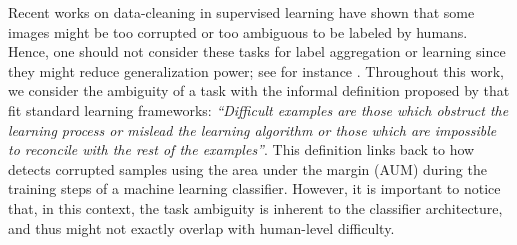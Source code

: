 Recent works on data-cleaning in supervised learning \citep{han2019deep, pleiss_identifying_2020, northcutt_confident_2021} have shown that some images might be too corrupted or too ambiguous to be labeled by humans.
Hence, one should not consider these tasks for label aggregation or learning since they might reduce generalization power; see for instance \citep{pleiss_identifying_2020}.
Throughout this work, we consider the ambiguity of a task with the informal definition proposed by \citet{angelova2004data} that fit standard learning frameworks: \emph{``Difficult examples are those which obstruct the learning process or mislead the learning algorithm or those which are impossible to reconcile with the rest of the examples''}.
This definition links back to how \citet{pleiss_identifying_2020} detects corrupted samples using the area under the margin (AUM) during the training steps of a machine learning classifier.
However, it is important to notice that, in this context, the task ambiguity is inherent to the classifier architecture, and thus might not exactly overlap with human-level difficulty.

